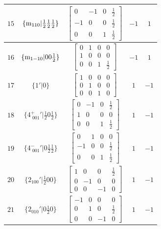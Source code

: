 \documentclass[fleqn,8pt]{jsarticle}
\begin{document}
\begin{longtable}{ccccc}
$ 15 $ & $ \{{\rm m}_{110}|\frac{1}{2} \frac{1}{2} \frac{1}{2}\} $ & $ \begin{bmatrix} 0 & -1 & 0 & \frac{1}{2} \\ -1 & 0 & 0 & \frac{1}{2} \\ 0 & 0 & 1 & \frac{1}{2} \end{bmatrix} $ & $ -1 $ & $ 1 $ \\ \hline
$ 16 $ & $ \{{\rm m}_{1-10}|0 0 \frac{1}{2}\} $ & $ \begin{bmatrix} 0 & 1 & 0 & 0 \\ 1 & 0 & 0 & 0 \\ 0 & 0 & 1 & \frac{1}{2} \end{bmatrix} $ & $ -1 $ & $ 1 $ \\ \hline
$ 17 $ & $ \{1{}'|0\} $ & $ \begin{bmatrix} 1 & 0 & 0 & 0 \\ 0 & 1 & 0 & 0 \\ 0 & 0 & 1 & 0 \end{bmatrix} $ & $ 1 $ & $ -1 $ \\ \hline
$ 18 $ & $ \{4^{+}_{\,\,001}{}'|\frac{1}{2} 0 \frac{1}{2}\} $ & $ \begin{bmatrix} 0 & -1 & 0 & \frac{1}{2} \\ 1 & 0 & 0 & 0 \\ 0 & 0 & 1 & \frac{1}{2} \end{bmatrix} $ & $ 1 $ & $ -1 $ \\ \hline
$ 19 $ & $ \{4^{-}_{\,\,001}{}'|0 \frac{1}{2} \frac{1}{2}\} $ & $ \begin{bmatrix} 0 & 1 & 0 & 0 \\ -1 & 0 & 0 & \frac{1}{2} \\ 0 & 0 & 1 & \frac{1}{2} \end{bmatrix} $ & $ 1 $ & $ -1 $ \\ \hline
$ 20 $ & $ \{2{}_{100}{}'|\frac{1}{2} 0 0\} $ & $ \begin{bmatrix} 1 & 0 & 0 & \frac{1}{2} \\ 0 & -1 & 0 & 0 \\ 0 & 0 & -1 & 0 \end{bmatrix} $ & $ 1 $ & $ -1 $ \\ \hline
$ 21 $ & $ \{2{}_{010}{}'|0 \frac{1}{2} 0\} $ & $ \begin{bmatrix} -1 & 0 & 0 & 0 \\ 0 & 1 & 0 & \frac{1}{2} \\ 0 & 0 & -1 & 0 \end{bmatrix} $ & $ 1 $ & $ -1 $ \\ \hline

\end{longtable}
\end{document}
